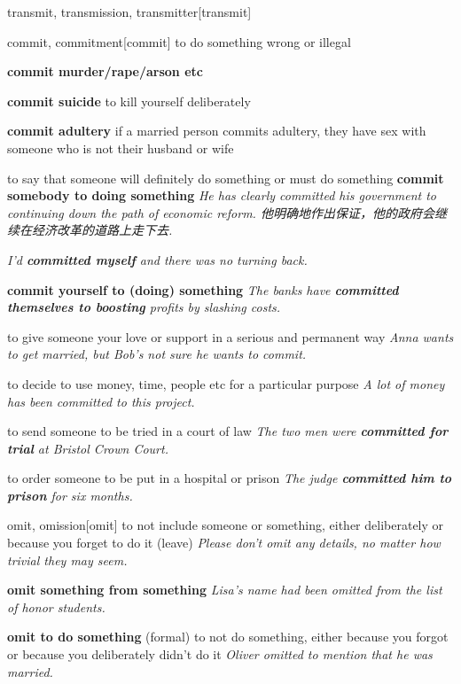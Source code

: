 \begin{DefWord}{transmit, transmission, transmitter}[transmit]
\end{DefWord}

\begin{DefWord}{commit, commitment}[commit]
    to do something wrong or illegal

    \textbf{commit murder/rape/arson etc}

    \textbf{commit suicide} to kill yourself deliberately

    \textbf{commit adultery} if a married person commits adultery, they have sex with someone who is not their husband or wife

    to say that someone will definitely do something or must do something
    \textbf{commit somebody to doing something}
    \textit{He has clearly committed his government to continuing down the path of economic reform. 他明确地作出保证，他的政府会继续在经济改革的道路上走下去. }

    \textit{I’d \textbf{committed myself} and there was no turning back.}

    \textbf{commit yourself to (doing) something} 
    \textit{The banks have \textbf{committed themselves to boosting} profits by slashing costs.}

    to give someone your love or support in a serious and permanent way
    \textit{Anna wants to get married, but Bob’s not sure he wants to commit.}

    to decide to use money, time, people etc for a particular purpose
    \textit{A lot of money has been committed to this project.}

    to send someone to be tried in a court of law
    \textit{The two men were \textbf{committed for trial} at Bristol Crown Court.}

    to order someone to be put in a hospital or prison
    \textit{The judge \textbf{committed him to prison} for six months.}
\end{DefWord}

\begin{DefWord}{omit, omission}[omit]
    to not include someone or something, either deliberately or because you forget to do it (leave)
    \textit{Please don’t omit any details, no matter how trivial they may seem.}

    \textbf{omit something from something}
    \textit{Lisa’s name had been omitted from the list of honor students.}

    \textbf{omit to do something} (formal) to not do something, either because you forgot or because you deliberately didn’t do it
    \textit{Oliver omitted to mention that he was married.}
\end{DefWord}

